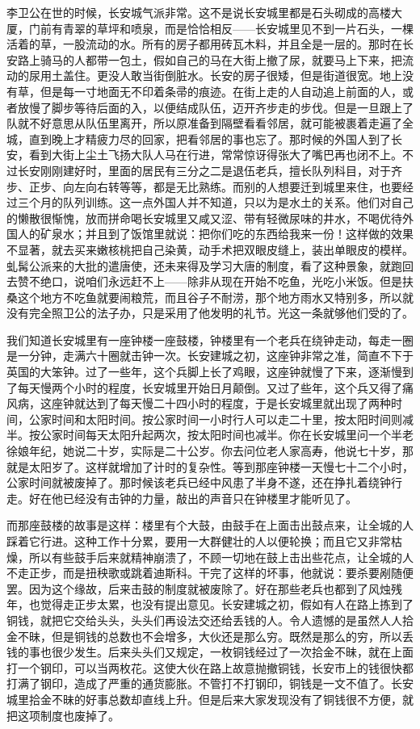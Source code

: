 李卫公在世的时候，长安城气派非常。这不是说长安城里都是石头砌成的高楼大厦，门前有青翠的草坪和喷泉，而是恰恰相反——长安城里见不到一片石头，一棵活着的草，一股流动的水。所有的房子都用砖瓦木料，并且全是一层的。那时在长安路上骑马的人都带一包土，假如自己的马在大街上撤了尿，就要马上下来，把流动的尿用土盖住。更没人敢当街倒脏水。长安的房子很矮，但是街道很宽。地上没有草，但是每一寸地面无不印着条帚的痕迹。在街上走的人自动追上前面的人，或者放慢了脚步等待后面的入，以便结成队伍，迈开齐步走的步伐。但是一旦跟上了队就不好意思从队伍里离开，所以原准备到隔壁看看邻居，就可能被裹着走遍了全城，直到晚上才精疲力尽的回家，把看邻居的事也忘了。那时候的外国人到了长安，看到大街上尘土飞扬大队人马在行进，常常惊讶得张大了嘴巴再也闭不上。不过长安刚刚建好时，里面的居民有三分之二是退伍老兵，擅长队列科目，对于齐步、正步、向左向右转等等，都是无比熟练。而别的人想要迁到城里来住，也要经过三个月的队列训练。这一点外国人并不知道，只以为是水土的关系。他们对自己的懒散很惭愧，放而拼命喝长安城里又咸又涩、带有轻微尿味的井水，不喝优待外国人的矿泉水；并且到了饭馆里就说：把你们吃的东西给我来一份！这样做的效果不显著，就去买来嫩核桃把自己染黄，动手术把双眼皮缝上，装出单眼皮的模样。虬髯公派来的大批的遣唐使，还未来得及学习大唐的制度，看了这种景象，就跑回去赞不绝口，说咱们永远赶不上——除非从现在开始不吃鱼，光吃小米饭。但是扶桑这个地方不吃鱼就要闹粮荒，而且谷子不耐涝，那个地方雨水又特别多，所以就没有完全照卫公的法子办，只是采用了他发明的礼节。光这一条就够他们受的了。 

我们知道长安城里有一座钟楼一座鼓楼，钟楼里有一个老兵在绕钟走动，每走一圈是一分钟，走满六十圈就击钟一次。长安建城之初，这座钟非常之准，简直不下于英国的大笨钟。过了一些年，这个兵脚上长了鸡眼，这座钟就慢了下来，逐渐慢到了每天慢两个小时的程度，长安城里开始日月颠倒。又过了些年，这个兵又得了痛风病，这座钟就达到了每天慢二十四小时的程度，于是长安城里就出现了两种时间，公家时间和太阳时间。按公家时间一小时行人可以走二十里，按太阳时间则减半。按公家时间每天太阳升起两次，按太阳时间也减半。你在长安城里问一个半老徐娘年纪，她说二十岁，实际是二十公岁。你去问位老人家高寿，他说七十岁，那就是太阳岁了。这样就增加了计时的复杂性。等到那座钟楼一天慢七十二个小时，公家时间就被废掉了。那时候该老兵已经中风患了半身不遂，还在挣扎着绕钟行走。好在他已经没有击钟的力量，敲出的声音只在钟楼里才能听见了。 

而那座鼓楼的故事是这样：楼里有个大鼓，由鼓手在上面击出鼓点来，让全城的人踩着它行进。这种工作十分累，要用一大群健壮的人以便轮换；而且它又非常枯燥，所以有些鼓手后来就精神崩溃了，不顾一切地在鼓上击出些花点，让全城的人不走正步，而是扭秧歌或跳着迪斯科。干完了这样的坏事，他就说：要杀要剐随便罢。因为这个缘故，后来击鼓的制度就被废除了。好在那些老兵也都到了风烛残年，也觉得走正步太累，也没有提出意见。长安建城之初，假如有人在路上拣到了铜钱，就把它交给头头，头头们再设法交还给丢钱的人。令人遗憾的是虽然人人拾金不昧，但是铜钱的总数也不会增多，大伙还是那么穷。既然是那么的穷，所以丢钱的事也很少发生。后来头头们又规定，一枚铜钱经过了一次拾金不昧，就在上面打一个钢印，可以当两枚花。这使大伙在路上故意抛撤铜钱，长安市上的钱很快都打满了钢印，造成了严重的通货膨胀。不管打不打钢印，铜钱是一文不值了。长安城里拾金不昧的好事总数却直线上升。但是后来大家发现没有了铜钱很不方便，就把这项制度也废掉了。 

